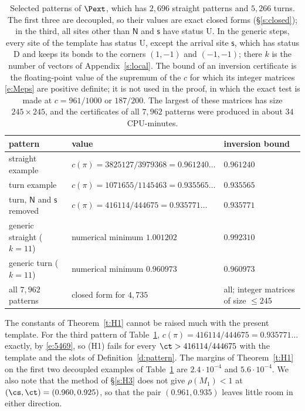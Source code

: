 \begin{table}[ht]
\centering
\small
\begin{tabular}{lll}
pattern & value & inversion bound \\ \hline
straight example & $c(\pi) = 3825127/3979368 = 0.961240\ldots$ & $0.961240$ \\
turn example & $c(\pi) = 1071655/1145463 = 0.935565\ldots$ & $0.935565$ \\
turn, $\mathsf N$ and $\mathsf s$ removed & $c(\pi) = 416114/444675 = 0.935771\ldots$ & $0.935771$ \\
generic straight ($k = 11$) & numerical minimum $1.001202$ & $0.992310$ \\
generic turn ($k = 11$) & numerical minimum $0.960973$ & $0.960973$ \\ \hline
all $7{,}962$ patterns & closed form for $4{,}735$ & all; integer matrices of size $\le 245$
\end{tabular}
\caption{Selected patterns of $\Pext$, which has $2{,}696$ straight patterns and $5{,}266$ turns. The first three are decoupled, so their values are exact closed forms (\S\ref{s:closed}); in the third, all sites other than $\mathsf N$ and $\mathsf s$ have status $\mathrm U$. In the generic steps, every site of the template has status $\mathrm U$, except the arrival site $\mathsf s$, which has status $\mathrm D$ and keeps its bonds to the corners $(1, -1)$ and $(-1, -1)$; there $k$ is the number of vectors of Appendix~\ref{s:local}. The bound of an inversion certificate is the floating-point value of the supremum of the $c$ for which its integer matrices \eqref{e:Meps} are positive definite; it is not used in the proof, in which the exact test is made at $c = 961/1000$ or $187/200$. The largest of these matrices has size $245 \times 245$, and the certificates of all $7{,}962$ patterns were produced in about $34$ CPU-minutes.}\label{tab:H1}
\end{table}

\begin{remark}\label{r:H1sharp}
The constants of Theorem~\ref{t:H1} cannot be raised much with the present template. For the third pattern of Table~\ref{tab:H1}, $c(\pi) = 416114/444675 = 0.935771\ldots$ exactly, by \eqref{e:5469}, so (H1) fails for every $\ct > 416114/444675$ with the template and the slots of Definition~\ref{d:pattern}. The margins of Theorem~\ref{t:H1} on the first two decoupled examples of Table~\ref{tab:H1} are $2.4 \cdot 10^{-4}$ and $5.6 \cdot 10^{-4}$. We also note that the method of \S\ref{s:H3} does not give $\rho(M_1) < 1$ at $(\cs, \ct) = (0.960, 0.925)$, so that the pair $(0.961, 0.935)$ leaves little room in either direction.
\end{remark}

